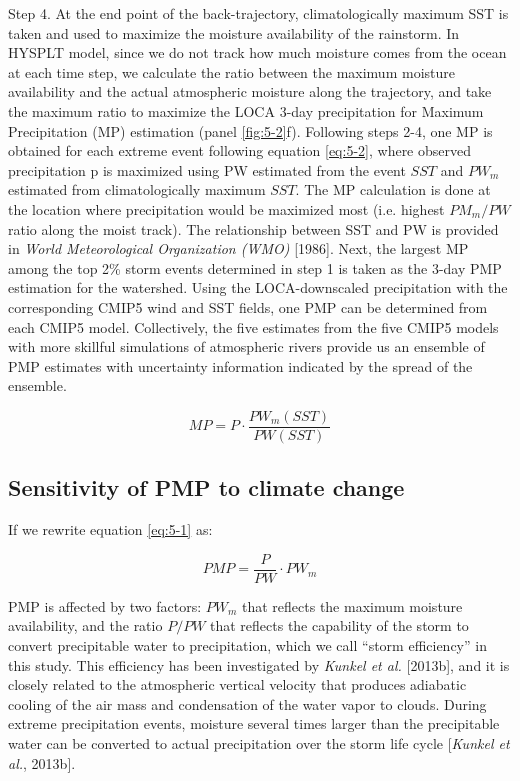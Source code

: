 Step 4. At the end point of the back-trajectory, climatologically maximum SST is taken and used to maximize the moisture availability of the rainstorm. In HYSPLT model, since we do not track how much moisture comes from the ocean at each time step, we calculate the ratio between the maximum moisture availability and the actual atmospheric moisture along the trajectory, and take the maximum ratio to maximize the LOCA 3-day precipitation for Maximum Precipitation (MP) estimation (panel \ref{fig:5-2}f).
Following steps 2-4, one MP is obtained for each extreme event following equation \ref{eq:5-2}, where observed precipitation p is maximized using PW estimated from the event $SST$ and $PW_m$ estimated from climatologically maximum $SST$. The MP calculation is done at the location where precipitation would be maximized most (i.e. highest $PM_m/PW$ ratio along the moist track). The relationship between SST and PW is provided in \textit{World Meteorological Organization (WMO)} [1986]. Next, the largest MP among the top 2\% storm events determined in step 1 is taken as the 3-day PMP estimation for the watershed. Using the LOCA-downscaled precipitation with the corresponding CMIP5 wind and SST fields, one PMP can be determined from each CMIP5 model. Collectively, the five estimates from the five CMIP5 models with more skillful simulations of atmospheric rivers provide us an ensemble of PMP estimates with uncertainty information indicated by the spread of the ensemble.

\begin{equation}
	MP = P \cdot \frac{{P{W_m}(SST)}}{{PW(SST)}}
	\label{eq:5-2}
\end{equation}

\subsection{Sensitivity of PMP to climate change}

If we rewrite equation \ref{eq:5-1} as:

\begin{equation}
	PMP = \frac{P}{{PW}} \cdot P{W_m}
	\label{eq:5-3}
\end{equation}

PMP is affected by two factors: $PW_m$ that reflects the maximum moisture availability, and the ratio $P/PW$ that reflects the capability of the storm to convert precipitable water to precipitation, which we call “storm efficiency” in this study. This efficiency has been investigated by \textit{Kunkel et al.} [2013b], and it is closely related to the atmospheric vertical velocity that produces adiabatic cooling of the air mass and condensation of the water vapor to clouds. During extreme precipitation events, moisture several times larger than the precipitable water can be converted to actual precipitation over the storm life cycle [\textit{Kunkel et al.}, 2013b].

